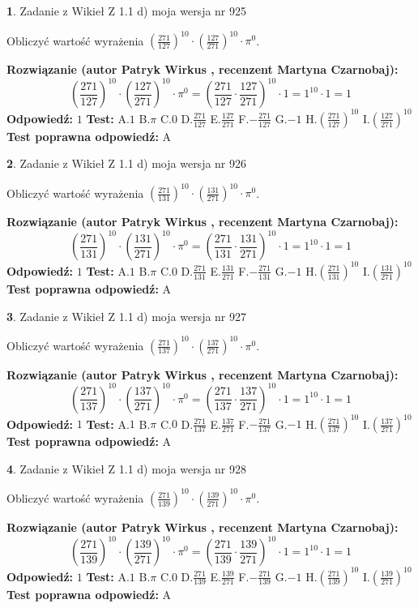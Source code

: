 \documentclass[12pt, a4paper]{article}
\theoremstyle{definition} %
\newtheorem{zad}{}
\newcommand{\zadStart}[1]{\begin{zad}#1\newline}
\newcommand{\zadStop}{\end{zad}}
\newcommand{\rozwStart}[2]{\noindent \textbf{Rozwiązanie (autor #1 , recenzent #2): }\newline}
\newcommand{\rozwStop}{\newline}
\newcommand{\odpStart}{\noindent \textbf{Odpowiedź:}\newline}
\newcommand{\odpStop}{\newline}
\newcommand{\testStart}{\noindent \textbf{Test:}\newline}
\newcommand{\testStop}{\newline}
\newcommand{\kluczStart}{\noindent \textbf{Test poprawna odpowiedź:}\newline}
\newcommand{\kluczStop}{\newline}
\begin{document}
\zadStart{Zadanie z Wikieł Z 1.1 d) moja wersja nr 925}

Obliczyć wartość wyrażenia $(\frac{271}{127})^{10} \cdot (\frac{127}{271})^{10} \cdot \pi^{0}$.
\zadStop
\rozwStart{Patryk Wirkus}{Martyna Czarnobaj}
$$(\frac{271}{127})^{10} \cdot (\frac{127}{271})^{10} \cdot \pi^{0} = (\frac{271}{127} \cdot \frac{127}{271})^{10} \cdot 1 = 1^{10} \cdot 1 = 1$$
\rozwStop
\odpStart
$1$
\odpStop
\testStart
A.$1$ B.$\pi$ C.$0$ D.$\frac{271}{127}$ E.$\frac{127}{271}$
F.$-\frac{271}{127}$ G.$-1$
H.$(\frac{271}{127})^{10}$
I.$(\frac{127}{271})^{10}$
\testStop
\kluczStart
A
\kluczStop



\zadStart{Zadanie z Wikieł Z 1.1 d) moja wersja nr 926}

Obliczyć wartość wyrażenia $(\frac{271}{131})^{10} \cdot (\frac{131}{271})^{10} \cdot \pi^{0}$.
\zadStop
\rozwStart{Patryk Wirkus}{Martyna Czarnobaj}
$$(\frac{271}{131})^{10} \cdot (\frac{131}{271})^{10} \cdot \pi^{0} = (\frac{271}{131} \cdot \frac{131}{271})^{10} \cdot 1 = 1^{10} \cdot 1 = 1$$
\rozwStop
\odpStart
$1$
\odpStop
\testStart
A.$1$ B.$\pi$ C.$0$ D.$\frac{271}{131}$ E.$\frac{131}{271}$
F.$-\frac{271}{131}$ G.$-1$
H.$(\frac{271}{131})^{10}$
I.$(\frac{131}{271})^{10}$
\testStop
\kluczStart
A
\kluczStop



\zadStart{Zadanie z Wikieł Z 1.1 d) moja wersja nr 927}

Obliczyć wartość wyrażenia $(\frac{271}{137})^{10} \cdot (\frac{137}{271})^{10} \cdot \pi^{0}$.
\zadStop
\rozwStart{Patryk Wirkus}{Martyna Czarnobaj}
$$(\frac{271}{137})^{10} \cdot (\frac{137}{271})^{10} \cdot \pi^{0} = (\frac{271}{137} \cdot \frac{137}{271})^{10} \cdot 1 = 1^{10} \cdot 1 = 1$$
\rozwStop
\odpStart
$1$
\odpStop
\testStart
A.$1$ B.$\pi$ C.$0$ D.$\frac{271}{137}$ E.$\frac{137}{271}$
F.$-\frac{271}{137}$ G.$-1$
H.$(\frac{271}{137})^{10}$
I.$(\frac{137}{271})^{10}$
\testStop
\kluczStart
A
\kluczStop



\zadStart{Zadanie z Wikieł Z 1.1 d) moja wersja nr 928}

Obliczyć wartość wyrażenia $(\frac{271}{139})^{10} \cdot (\frac{139}{271})^{10} \cdot \pi^{0}$.
\zadStop
\rozwStart{Patryk Wirkus}{Martyna Czarnobaj}
$$(\frac{271}{139})^{10} \cdot (\frac{139}{271})^{10} \cdot \pi^{0} = (\frac{271}{139} \cdot \frac{139}{271})^{10} \cdot 1 = 1^{10} \cdot 1 = 1$$
\rozwStop
\odpStart
$1$
\odpStop
\testStart
A.$1$ B.$\pi$ C.$0$ D.$\frac{271}{139}$ E.$\frac{139}{271}$
F.$-\frac{271}{139}$ G.$-1$
H.$(\frac{271}{139})^{10}$
I.$(\frac{139}{271})^{10}$
\testStop
\kluczStart
A
\kluczStop
\end{document}
